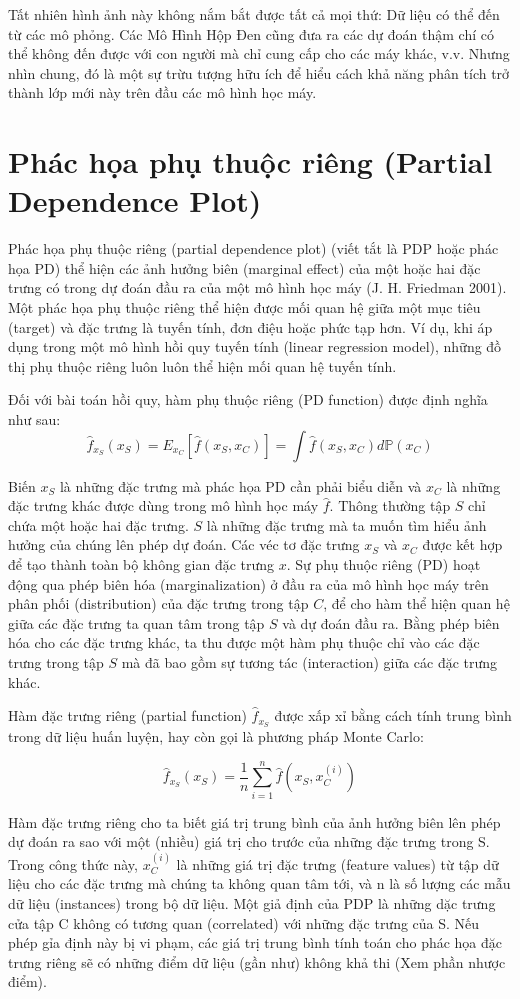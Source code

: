 Tất nhiên hình ảnh này không nắm bắt được tất cả mọi thứ: Dữ liệu có thể đến từ các mô phỏng. Các Mô Hình Hộp Đen cũng đưa ra các dự đoán thậm chí có thể không đến được với con người mà chỉ cung cấp cho các máy khác, v.v. Nhưng nhìn chung, đó là một sự trừu tượng hữu ích để hiểu cách khả năng phân tích trở thành lớp mới này trên đầu các mô hình học máy.

\clearpage
\section{Phác họa phụ thuộc riêng (Partial Dependence Plot)}\label{Chapter_5.1}
Phác họa phụ thuộc riêng (partial dependence plot) (viết tắt là PDP hoặc phác họa PD) thể hiện các ảnh hưởng biên (marginal effect) của một hoặc hai đặc trưng có trong dự đoán đầu ra của một mô hình học máy (J. H. Friedman 2001). Một phác họa phụ thuộc riêng thể hiện được mối quan hệ giữa một mục tiêu (target) và đặc trưng là tuyến tính, đơn điệu hoặc phức tạp hơn. Ví dụ, khi áp dụng trong một mô hình hồi quy tuyến tính (linear regression model), 
những đồ thị phụ thuộc riêng luôn luôn thể hiện mối quan hệ tuyến tính. 

Đối với bài toán hồi quy, hàm phụ thuộc riêng (PD function) được định nghĩa như sau:
$$\hat{f}_{x_S}(x_S)=E_{x_C}\left[\hat{f}(x_S,x_C)\right]=\int\hat{f}(x_S,x_C)d\mathbb{P}(x_C)$$

Biến $x_S$ là những đặc trưng mà phác họa PD cần phải biểu diễn và $x_C$ là những đặc trưng khác được dùng trong mô hình học máy $\hat{f}$. Thông thường tập $S$ chỉ chứa một hoặc hai đặc trưng. $S$ là những đặc trưng mà ta muốn tìm hiểu ảnh hưởng của chúng lên phép dự đoán. Các véc tơ đặc trưng $x_S$ và $x_C$ được kết hợp để tạo thành toàn bộ không gian đặc trưng $x$. Sự phụ thuộc riêng (PD) hoạt động qua phép biên hóa (marginalization) ở đầu ra của mô hình học máy trên phân phối (distribution) của đặc trưng trong tập $C$, để cho hàm thể hiện quan hệ giữa các đặc trưng ta quan tâm trong tập $S$ và dự đoán đầu ra. Bằng phép biên hóa cho các đặc trưng khác, ta thu được một hàm phụ thuộc chỉ vào các đặc trưng trong tập $S$ mà đã bao gồm sự tương tác (interaction) giữa các đặc trưng khác.  

Hàm đặc trưng riêng (partial function) $\hat{f}_{x_S}$ được xấp xỉ bằng cách tính trung bình trong dữ liệu huấn luyện, hay còn gọi là phương pháp Monte Carlo:

$$\hat{f}_{x_S}(x_S)=\frac{1}{n}\sum_{i=1}^n\hat{f}(x_S,x^{(i)}_{C})$$

Hàm đặc trưng riêng cho ta biết giá trị trung bình của ảnh hưởng biên lên phép dự đoán ra sao với một (nhiều) giá trị cho trước của những đặc trưng trong S. Trong công thức này, $x^{(i)}_{C}$ là những giá trị đặc trưng (feature values) từ tập dữ liệu cho các đặc trưng mà chúng ta không quan tâm tới, và n là số lượng các mẫu dữ liệu (instances) trong bộ dữ liệu. Một giả định của PDP là những dặc trưng cửa tập C không có tương quan (correlated) với những đặc trưng của S. Nếu phép gỉa định này bị vi phạm, các giá trị trung bình tính toán cho phác họa đặc trưng riêng sẽ có những điểm dữ liệu (gần như) không khả thi (Xem phần 
nhược điểm).

